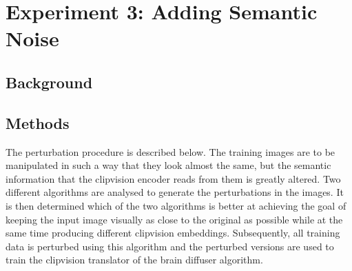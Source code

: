 \section{Experiment 3: Adding Semantic Noise}




\subsection{Background}

\subsection{Methods}

The perturbation procedure is described below. The training images are to be manipulated in such a way that they look almost the same, but the semantic information that the clipvision encoder reads from them is greatly altered. Two different algorithms are analysed to generate the perturbations in the images. It is then determined which of the two algorithms is better at achieving the goal of keeping the input image visually as close to the original as possible while at the same time producing different clipvision embeddings. Subsequently, all training data is perturbed using this algorithm and the perturbed versions are used to train the clipvision translator of the brain diffuser algorithm.

